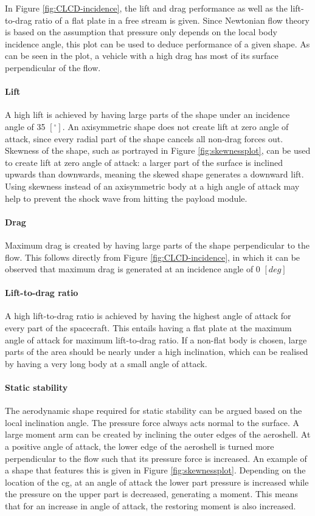 In Figure \ref{fig:CLCD-incidence}, the lift and drag performance as well as the lift-to-drag ratio of a flat plate in a free stream is given. Since Newtonian flow theory is based on the assumption that pressure only depends on the local body incidence angle, this plot can be used to deduce performance of a given shape. As can be seen in the plot, a vehicle with a high drag has most of its surface perpendicular of the flow.

\paragraph{Lift}
A high lift is achieved by having large parts of the shape under an incidence angle of 35 $\left[^\circ\right]$. An axisymmetric shape does not create lift at zero angle of attack, since every radial part of the shape cancels all non-drag forces out. Skewness of the shape, such as portrayed in Figure \ref{fig:skewnessplot}, can be used to create lift at zero angle of attack: a larger part of the surface is inclined upwards than downwards, meaning the skewed shape generates a downward lift. Using skewness instead of an axisymmetric body at a high angle of attack may help to prevent the shock wave from hitting the payload module.

\paragraph{Drag}
Maximum drag is created by having large parts of the shape perpendicular to the flow. This follows directly from Figure \ref{fig:CLCD-incidence}, in which it can be observed that maximum drag is generated at an incidence angle of 0 $\left[deg\right]$

\paragraph{Lift-to-drag ratio}
A high lift-to-drag ratio is achieved by having the highest angle of attack for every part of the spacecraft. This entails having a flat plate at the maximum angle of attack for maximum lift-to-drag ratio. If a non-flat body is chosen, large parts of the area should be nearly under a high inclination, which can be realised by having a very long body at a small angle of attack.

\paragraph{Static stability}
The aerodynamic shape required for static stability can be argued based on the local inclination angle. The pressure force always acts normal to the surface. A large moment arm can be created by inclining the outer edges of the aeroshell. At a positive angle of attack, the lower edge of the aeroshell is turned more perpendicular to the flow such that its pressure force is increased. An example of a shape that features this is given in Figure \ref{fig:skewnessplot}. Depending on the location of the \acrfull{cg}, at an angle of attack the lower part pressure is increased while the pressure on the upper part is decreased, generating a moment. This means that for an increase in angle of attack, the restoring moment is also increased.

